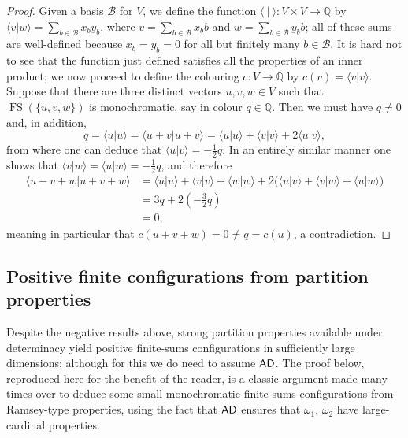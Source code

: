 \documentclass[10pt,a4paper]{amsart}
\theoremstyle{definition}
\newcommand{\ad}{\mathnormal{\mathsf{AD}}}
\theoremstyle{remark}
\numberwithin{equation}{section}
\begin{document}
    \begin{proof}%
        Given a basis $\mathcal{B}$ for $V$, we define the function $\langle\ |\ \rangle:V\times V\longrightarrow\mathbb Q$ by $\langle v|w\rangle=\sum_{b\in\mathcal B}x_b y_b$, where $v=\sum_{b\in\mathcal B}x_b b$ and $w=\sum_{b\in\mathcal B}y_b b$; all of these sums are well-defined because $x_b=y_b=0$ for all but finitely many $b\in\mathcal B$. It is hard not to see that the function just defined satisfies all the properties of an inner product; we now proceed to define the colouring $c:V\longrightarrow\mathbb{Q}$ by $c(v)=\langle v|v\rangle$. Suppose that there are three distinct vectors $u,v,w\in V$ such that $\operatorname{FS}(\{u,v,w\})$ is monochromatic, say in colour $q\in\mathbb Q$. Then we must have $q\neq 0$ and, in addition,
        \begin{equation*}
            q=\langle u|u\rangle=\langle u+v|u+v\rangle=\langle u|u\rangle+\langle v|v\rangle+2\langle u|v\rangle,
        \end{equation*}
        from where one can deduce that $\langle u|v\rangle=-\frac{1}{2}q$. In an entirely similar manner one shows that $\langle v|w\rangle=\langle u|w\rangle=-\frac{1}{2}q$, and therefore
        \begin{align*}
            \langle u+v+w|u+v+w\rangle
            &=\langle u|u\rangle+\langle v|v\rangle+\langle w|w\rangle+2\big(\langle u|v\rangle+\langle v|w\rangle+\langle u|w\rangle\big)\\
            &=3q+2\left(-\frac{3}{2}q\right)\\
            &=0,
        \end{align*}
        meaning in particular that $c(u+v+w)=0\neq q=c(u)$, a contradiction.
    \end{proof}


\subsection{Positive finite configurations from partition properties}\label{subsec:hindman-positives}

Despite the negative results above, strong partition properties available under determinacy yield positive finite-sums configurations in sufficiently large dimensions; although for this we do need to assume $\ad$. The proof below, reproduced here for the benefit of the reader, is a classic argument made many times over to deduce some small monochromatic finite-sums configurations from Ramsey-type properties, using the fact that $\ad$ ensures that $\omega_1$, $\omega_2$ have large-cardinal properties.
\end{document}
